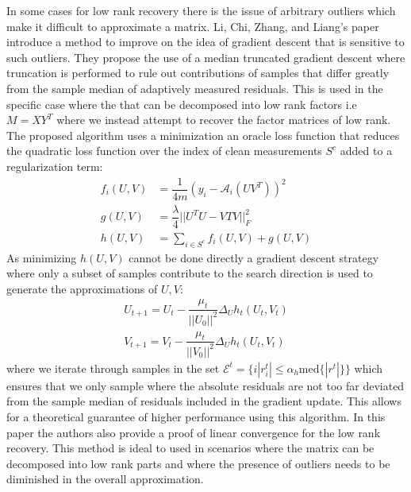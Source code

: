 \documentclass[12pt]{article}
\begin{document}
In some cases for low rank recovery there is the issue of arbitrary outliers which make it difficult to approximate a matrix. Li, Chi, Zhang, and Liang's paper introduce a method to improve on the idea of gradient descent that is sensitive to such outliers. They propose the use of a median truncated gradient descent where truncation is performed to rule out contributions of samples that differ greatly from the sample median of adaptively measured residuals. This is used in the specific case where the that can be decomposed into low rank factors i.e $M = XY^T$ where we instead attempt to recover the factor matrices of low rank. The proposed algorithm uses a minimization an oracle loss function that reduces the quadratic loss function over the index of clean measurements $S^c$  added to a regularization term: 
\begin{align*}
f_i(U,V) &= \dfrac{1}{4m}(y_i - \mathcal{A}_i(UV^T))^2 \\
g(U,V) &= \dfrac{\lambda}{4}||U^TU-VTV||^2_F \\
h(U,V) &= \sum_{i\in S^c} f_i(U,V) + g(U,V)
\end{align*}
As minimizing $h(U,V)$ cannot be done directly a gradient descent strategy where only a subset of samples contribute to the search direction is used to generate the approximations of $U,V$:
\begin{align*}
U_{t+1} = U_t - \dfrac{\mu_t}{||U_0||^2} \Delta_U h_t(U_t,V_t) \\
V_{t+1} = V_t - \dfrac{\mu_t}{||V_0||^2} \Delta_U h_t(U_t,V_t)
\end{align*}
where we iterate through samples in the set $\mathcal{E}^t = \{i|r_i^t|\leq \alpha_h \text{med} \{|r^t|\} \}$ which ensures that we only sample where the absolute residuals are not too far deviated from the sample median of residuals included in the gradient update. This allows for a theoretical guarantee of higher performance using this algorithm. In this paper the authors also provide a proof of linear convergence for the low rank recovery. This method is ideal to used in scenarios where the matrix can be decomposed into low rank parts and where the presence of outliers needs to be diminished in the overall approximation. \\
\end{document}
